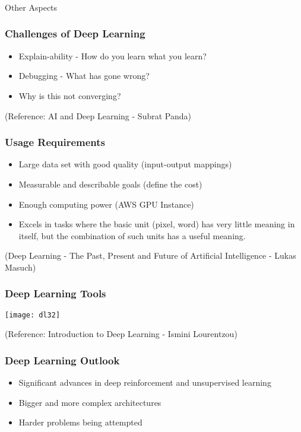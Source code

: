 \begin{frame}[fragile]\frametitle{}
\begin{center}
{\Large Other Aspects}
\end{center}
\end{frame}

\begin{frame}[fragile] \frametitle{Challenges of Deep Learning}
\begin{itemize}
\item Explain-ability - How do you learn what you learn?
\item Debugging - What has gone wrong?
\item Why is this not converging?
\end{itemize}
\tiny{(Reference: AI and Deep Learning - Subrat Panda)}
\end{frame}

\begin{frame}[fragile]\frametitle{Usage Requirements}
\begin{itemize}
\item Large data set with good quality (input-output mappings)
\item Measurable and describable goals (define the cost)
\item Enough computing power (AWS GPU Instance)
\item Excels in tasks where the basic unit (pixel, word) has very little
meaning in itself, but the combination of such units has a useful
meaning.
\end{itemize}
{\tiny (Deep Learning - The Past, Present and Future of Artificial Intelligence - Lukas Masuch)}
\end{frame}


\begin{frame}[fragile] \frametitle{Deep Learning Tools}
\begin{center}
\texttt{[image: dl32]}
\end{center}
\tiny{(Reference: Introduction to Deep Learning - Ismini Lourentzou)}
\end{frame}

\begin{frame}[fragile] \frametitle{Deep Learning Outlook}
\begin{itemize}
\item Significant advances in deep reinforcement and unsupervised learning
\item Bigger and more complex architectures
\item Harder problems being attempted
\end{itemize}
\end{frame}



